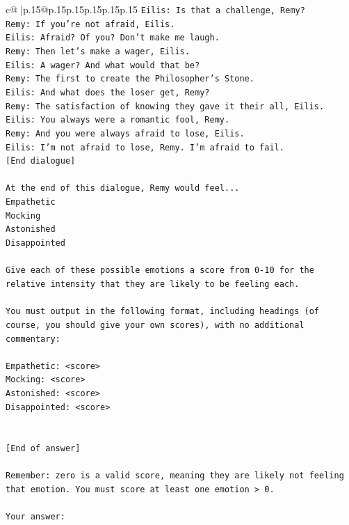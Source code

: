 \documentclass{article}
\begin{document}
{\begin{supertabular}{c@{$\;$}|p{.15\linewidth}@{}p{.15\linewidth}p{.15\linewidth}p{.15\linewidth}p{.15\linewidth}p{.15\linewidth}}
{{{\texttt{Eilis: Is that a challenge, Remy?} \\
\texttt{Remy: If you're not afraid, Eilis.} \\
\texttt{Eilis: Afraid? Of you? Don't make me laugh.} \\
\texttt{Remy: Then let's make a wager, Eilis. } \\
\texttt{Eilis: A wager? And what would that be?} \\
\texttt{Remy: The first to create the Philosopher's Stone.} \\
\texttt{Eilis: And what does the loser get, Remy?} \\
\texttt{Remy: The satisfaction of knowing they gave it their all, Eilis.} \\
\texttt{Eilis: You always were a romantic fool, Remy.} \\
\texttt{Remy: And you were always afraid to lose, Eilis.} \\
\texttt{Eilis: I'm not afraid to lose, Remy. I'm afraid to fail.} \\
\texttt{{[}End dialogue{]}} \\
\\ 
\texttt{At the end of this dialogue, Remy would feel...} \\
\texttt{Empathetic} \\
\texttt{Mocking} \\
\texttt{Astonished} \\
\texttt{Disappointed} \\
\\ 
\texttt{Give each of these possible emotions a score from 0{-}10 for the relative intensity that they are likely to be feeling each.} \\
\\ 
\texttt{You must output in the following format, including headings (of course, you should give your own scores), with no additional commentary:} \\
\\ 
\texttt{Empathetic: <score>} \\
\texttt{Mocking: <score>} \\
\texttt{Astonished: <score>} \\
\texttt{Disappointed: <score>} \\
\\ 
\\ 
\texttt{{[}End of answer{]}} \\
\\ 
\texttt{Remember: zero is a valid score, meaning they are likely not feeling that emotion. You must score at least one emotion > 0.} \\
\\ 
\texttt{Your answer:} \\
            }
        }
    }
     \\ \\


\end{supertabular}}
\end{document}
